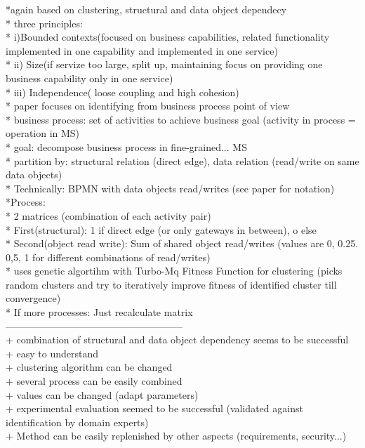 *again based on clustering, structural and data object dependecy\\
* three principles: \\
* i)Bounded contexts(focused on business capabilities, related functionality implemented in one capability and implemented in one service)\\
* ii)  Size(if servize too large, split up, maintaining focus on providing one business capability only in one service)\\
* iii) Independence( loose coupling and high cohesion)\\
* paper focuses on identifying from business process point of view\\
* business process: set of activities to achieve business goal (activity in process = operation in MS)\\
* goal: decompose business process in fine-grained... MS\\
* partition by: structural relation (direct edge), data relation (read/write on same data objects)\\
* Technically: BPMN with data objects read/writes (see paper for notation)\\

*Process:\\
* 2 matrices  (combination of each activity pair)\\
* First(structural): 1 if direct edge (or only gateways in between), o else\\
* Second(object read write): Sum of shared object read/writes (values are 0, 0.25. 0,5, 1 for different combinations of read/writes)\\
* uses genetic algortihm with Turbo-Mq Fitness Function for clustering (picks random clusters and try to iteratively improve fitness of identified cluster till convergence)\\
* If more processes: Just recalculate matrix \\

------------------------------------------------------\\
+ combination of structural and data object dependency seems to be successful  \\
+ easy to understand\\
+ clustering algorithm can be changed\\
+ several process can be easily combined\\
+ values can be changed (adapt parameters)\\
+ experimental evaluation seemed to be successful (validated against identification by domain experts)\\
+ Method can be easily replenished by other aspects (requirements, security...)\\



